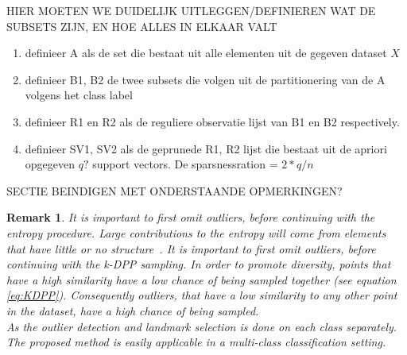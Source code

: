 \documentclass[preprint,12pt]{elsarticle}
\newtheorem*{remark}{Remark}
\begin{document}
	
	HIER MOETEN WE DUIDELIJK UITLEGGEN/DEFINIEREN WAT DE SUBSETS ZIJN, EN HOE ALLES IN ELKAAR VALT

	\begin{enumerate}
		\item definieer A als de set die bestaat uit alle elementen uit de gegeven dataset $X$
		\item definieer B1, B2 de twee subsets die volgen uit de partitionering van de A volgens het class label
		\item definieer R1 en R2 als de reguliere observatie lijst van B1 en B2 respectively.
		\item definieer SV1, SV2 als de geprunede R1, R2 lijst die bestaat uit de apriori opgegeven $q?$ support vectors. De sparsnessration = $2*q / n$
	\end{enumerate}	

	
	SECTIE BEINDIGEN MET ONDERSTAANDE OPMERKINGEN?
	
	\begin{remark}
		It is important to first omit outliers, before continuing with the entropy procedure. Large contributions to the entropy will come from elements that have little or no structure~\cite{girolami2002orthogonal}.
		It is important to first omit outliers, before continuing with the k-DPP sampling. In order to promote diversity, points that have a high similarity have a low chance of being sampled together (see equation \eqref{eq:KDPP}). Consequently outliers, that have a low similarity to any other point in the dataset, have a high chance of being sampled.\\	
	 	As the outlier detection and landmark selection is done on each class separately. The proposed method is easily applicable in a multi-class classification setting. 
	 \end{remark}
	
\end{document}
